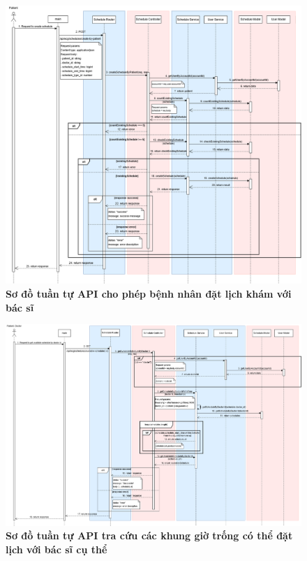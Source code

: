 \begin{figure}[H]
	\centering
	\includegraphics[width=16cm]{Images/api_sequence/schedule/createScheduleByPatient.drawio.png}
	\caption[Sơ đồ tuần tự API cho phép bệnh nhân đặt lịch khám với bác sĩ]{\bfseries \fontsize{12pt}{0pt}\selectfont Sơ đồ tuần tự API cho phép bệnh nhân đặt lịch khám với bác sĩ}
	\label{sequence_diagram_create_schedule_by_patient}
\end{figure}

\begin{figure}[H]
	\centering
	\includegraphics[width=16cm]{Images/api_sequence/schedule/getAvailableScheduleByDoctorId.drawio.png}
	\caption[Sơ đồ tuần tự API tra cứu các khung giờ trống có thể đặt lịch với bác sĩ cụ thể]{\bfseries \fontsize{12pt}{0pt}\selectfont Sơ đồ tuần tự API tra cứu các khung giờ trống có thể đặt lịch với bác sĩ cụ thể}
	\label{sequence_diagram_get_available_by_doctor}
\end{figure}

